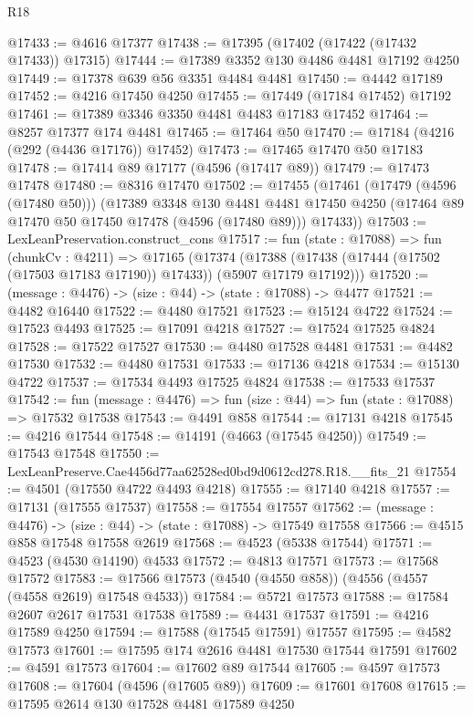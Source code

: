 \begin{lexlean}{R18}
\begin{coremodule}
@17433 := @4616 @17377
@17438 := @17395 (@17402 (@17422 (@17432 @17433)) @17315)
@17444 := @17389 @3352 @130 @4486 @4481 @17192 @4250
@17449 := @17378 @639 @56 @3351 @4484 @4481
@17450 := @4442 @17189
@17452 := @4216 @17450 @4250
@17455 := @17449 (@17184 @17452) @17192
@17461 := @17389 @3346 @3350 @4481 @4483 @17183 @17452
@17464 := @8257 @17377 @174 @4481
@17465 := @17464 @50
@17470 := @17184 (@4216 (@292 (@4436 @17176)) @17452)
@17473 := @17465 @17470 @50 @17183
@17478 := @17414 @89 @17177 (@4596 (@17417 @89))
@17479 := @17473 @17478
@17480 := @8316 @17470
@17502 := @17455
    (@17461
      (@17479 (@4596 (@17480 @50)))
      (@17389
        @3348
        @130
        @4481
        @4481
        @17450
        @4250
        (@17464 @89 @17470 @50 @17450 @17478 (@4596 (@17480 @89)))
        @17433))
@17503 := LexLeanPreservation.construct_cons
@17517 := fun (state : @17088) =>
  fun (chunkCv : @4211) =>
  @17165
    (@17374 (@17388 (@17438 (@17444 (@17502 (@17503 @17183 @17190)) @17433)) (@5907 @17179 @17192)))
@17520 := (message : @4476) -> (size : @44) -> (state : @17088) -> @4477
@17521 := @4482 @16440
@17522 := @4480 @17521
@17523 := @15124 @4722
@17524 := @17523 @4493
@17525 := @17091 @4218
@17527 := @17524 @17525 @4824
@17528 := @17522 @17527
@17530 := @4480 @17528 @4481
@17531 := @4482 @17530
@17532 := @4480 @17531
@17533 := @17136 @4218
@17534 := @15130 @4722
@17537 := @17534 @4493 @17525 @4824
@17538 := @17533 @17537
@17542 := fun (message : @4476) => fun (size : @44) => fun (state : @17088) => @17532 @17538
@17543 := @4491 @858
@17544 := @17131 @4218
@17545 := @4216 @17544
@17548 := @14191 (@4663 (@17545 @4250))
@17549 := @17543 @17548
@17550 := LexLeanPreserve.Cae4456d77aa62528ed0bd9d0612cd278.R18.__fits_21
@17554 := @4501 (@17550 @4722 @4493 @4218)
@17555 := @17140 @4218
@17557 := @17131 (@17555 @17537)
@17558 := @17554 @17557
@17562 := (message : @4476) -> (size : @44) -> (state : @17088) -> @17549 @17558
@17566 := @4515 @858 @17548 @17558 @2619
@17568 := @4523 (@5338 @17544)
@17571 := @4523 (@4530 @14190) @4533
@17572 := @4813 @17571
@17573 := @17568 @17572
@17583 := @17566 @17573 (@4540 (@4550 @858)) (@4556 (@4557 (@4558 @2619) @17548 @4533))
@17584 := @5721 @17573
@17588 := @17584 @2607 @2617 @17531 @17538
@17589 := @4431 @17537
@17591 := @4216 @17589 @4250
@17594 := @17588 (@17545 @17591) @17557
@17595 := @4582 @17573
@17601 := @17595 @174 @2616 @4481 @17530 @17544 @17591
@17602 := @4591 @17573
@17604 := @17602 @89 @17544
@17605 := @4597 @17573
@17608 := @17604 (@4596 (@17605 @89))
@17609 := @17601 @17608
@17615 := @17595 @2614 @130 @17528 @4481 @17589 @4250

\end{coremodule}
\end{lexlean}
